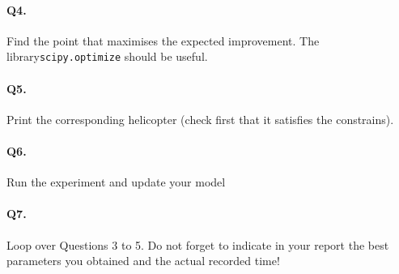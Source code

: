 \documentclass[12pt]{scrartcl}
\begin{document}
\paragraph{Q4.} Find the point that maximises the expected improvement. The library\linebreak \texttt{scipy.optimize} should be useful.

\paragraph{Q5.} Print the corresponding helicopter (check first that it satisfies the constrains).

\paragraph{Q6.} Run the experiment and update your model

\paragraph{Q7.} Loop over Questions 3 to 5. Do not forget to indicate in your report the best parameters you obtained and the actual recorded time!
\end{document}
